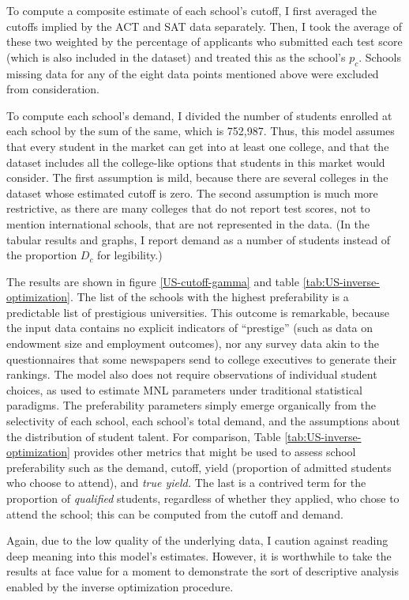 \documentclass[12pt]{article}
\theoremstyle{definition}
\begin{document}
To compute a composite estimate of each school's cutoff, I first averaged the cutoffs implied by the ACT and SAT data separately. Then, I took the average of these two weighted by the percentage of applicants who submitted each test score (which is also included in the dataset) and treated this as the school's $p_c$. Schools missing data for any of the eight data points mentioned above were excluded from consideration.

To compute each school's demand, I divided the number of students enrolled at each school by the sum of the same, which is 752,987. Thus, this model assumes that every student in the market can get into at least one college, and that the dataset includes all the college-like options that students in this market would consider. The first assumption is mild, because there are several colleges in the dataset whose estimated cutoff is zero. The second assumption is much more restrictive, as there are many colleges that do not report test scores, not to mention international schools, that are not represented in the data. (In the tabular results and graphs, I report demand as a number of students instead of the proportion $D_c$ for legibility.)

The results are shown in figure \ref{US-cutoff-gamma} and table \ref{tab:US-inverse-optimization}. The list of the schools with the highest preferability is a predictable list of prestigious universities. This outcome is remarkable, because the input data contains no explicit indicators of ``prestige'' (such as data on endowment size and employment outcomes), nor any survey data akin to the questionnaires that some newspapers send to college executives to generate their rankings. The model also does not require observations of individual student choices, as used to estimate MNL parameters under traditional statistical paradigms. The preferability parameters simply emerge organically from the selectivity of each school, each school's total demand, and the assumptions about the distribution of student talent. For comparison, Table \ref{tab:US-inverse-optimization} provides other metrics that might be used to assess school preferability such as the demand, cutoff, yield (proportion of admitted students who choose to attend), and \emph{true yield.} The last is a contrived term for the proportion of \emph{qualified} students, regardless of whether they applied, who chose to attend the school; this can be computed from the cutoff and demand. 

Again, due to the low quality of the underlying data, I caution against reading deep meaning into this model's estimates. However, it is worthwhile to take the results at face value for a moment to demonstrate the sort of descriptive analysis enabled by the inverse optimization procedure. 
\end{document}
